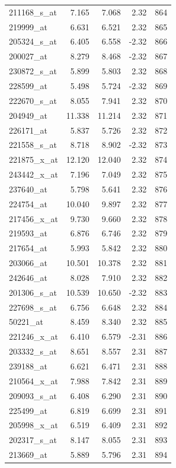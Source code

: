 \begin{footnotesize}
\begin{longtable}{lrrrr}
211168\_s\_at & 7.165 & 7.068 & 2.32 & 864 \\
219999\_at & 6.631 & 6.521 & 2.32 & 865 \\
205324\_s\_at & 6.405 & 6.558 & -2.32 & 866 \\
200027\_at & 8.279 & 8.468 & -2.32 & 867 \\
230872\_s\_at & 5.899 & 5.803 & 2.32 & 868 \\
228599\_at & 5.498 & 5.724 & -2.32 & 869 \\
222670\_s\_at & 8.055 & 7.941 & 2.32 & 870 \\
204949\_at & 11.338 & 11.214 & 2.32 & 871 \\
226171\_at & 5.837 & 5.726 & 2.32 & 872 \\
221558\_s\_at & 8.718 & 8.902 & -2.32 & 873 \\
221875\_x\_at & 12.120 & 12.040 & 2.32 & 874 \\
243442\_x\_at & 7.196 & 7.049 & 2.32 & 875 \\
237640\_at & 5.798 & 5.641 & 2.32 & 876 \\
224754\_at & 10.040 & 9.897 & 2.32 & 877 \\
217456\_x\_at & 9.730 & 9.660 & 2.32 & 878 \\
219593\_at & 6.876 & 6.746 & 2.32 & 879 \\
217654\_at & 5.993 & 5.842 & 2.32 & 880 \\
203066\_at & 10.501 & 10.378 & 2.32 & 881 \\
242646\_at & 8.028 & 7.910 & 2.32 & 882 \\
201306\_s\_at & 10.539 & 10.650 & -2.32 & 883 \\
227698\_s\_at & 6.756 & 6.648 & 2.32 & 884 \\
50221\_at & 8.459 & 8.340 & 2.32 & 885 \\
221246\_x\_at & 6.410 & 6.579 & -2.31 & 886 \\
203332\_s\_at & 8.651 & 8.557 & 2.31 & 887 \\
239188\_at & 6.621 & 6.471 & 2.31 & 888 \\
210564\_x\_at & 7.988 & 7.842 & 2.31 & 889 \\
209093\_s\_at & 6.408 & 6.290 & 2.31 & 890 \\
225499\_at & 6.819 & 6.699 & 2.31 & 891 \\
205998\_x\_at & 6.519 & 6.409 & 2.31 & 892 \\
202317\_s\_at & 8.147 & 8.055 & 2.31 & 893 \\
213669\_at & 5.889 & 5.796 & 2.31 & 894 \\

\end{longtable}
\end{footnotesize}
